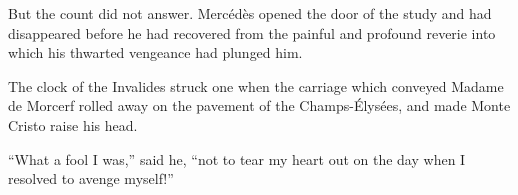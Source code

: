 But the count did not answer. Mercédès opened the door of the study and
had disappeared before he had recovered from the painful and profound
reverie into which his thwarted vengeance had plunged him.

The clock of the Invalides struck one when the carriage which conveyed
Madame de Morcerf rolled away on the pavement of the Champs-Élysées,
and made Monte Cristo raise his head.

“What a fool I was,” said he, “not to tear my heart out on the day when
I resolved to avenge myself!”
